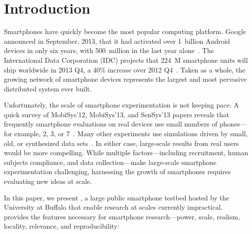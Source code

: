 \section{Introduction}
\label{sec-introduction}

Smartphones have quickly become the most popular computing platform. Google
announced in September, 2013, that it had activated over 1~billion Android
devices in only six years, with 500~million in the last year
alone~\cite{google-total-activations}. The International Data Corporation
(IDC) projects that 224~M smartphone units will ship worldwide in 2013 Q4, a
40\% increase over 2012 Q4~\cite{idc-smartphone-growth}. Taken as a whole,
the growing network of smartphone devices represents the largest and most
pervasive distributed system ever built.

Unfortunately, the scale of smartphone experimentation is not keeping pace. A
quick survey of MobiSys'12, MobiSys'13, and SenSys'13 papers reveals that
frequently smartphone evaluations on real devices use small numbers of
phones---for example, 2, 3, or 7~\cite{nowar-mobisys12, wang:mobisys:2013,
hao:sensys:2013}. Many other experiments use simulations driven by small,
old, or synthesized data sets~\cite{falcon-mobisys12, ace-mobisys12,
humanmobility-mobisys12}. In either case, large-scale results from real users
would be more compelling. While multiple factors---including recruitment,
human subjects compliance, and data collection---make large-scale smartphone
experimentation challenging, harnessing the growth of smartphones requires
evaluating new ideas at scale.

\newpage

In this paper, we present \PhoneLab{}, a large public smartphone testbed
hosted by the University at Buffalo that enable research at scales currently
impractical. \PhoneLab{} provides the features necessary for smartphone
research---power, scale, realism, locality, relevance, and reproducibility:

